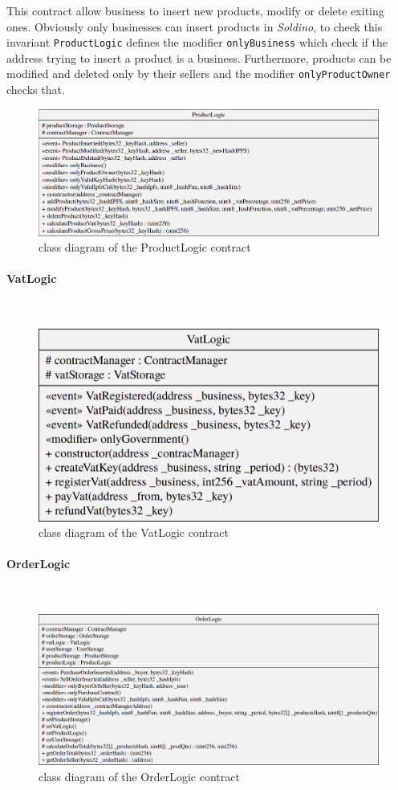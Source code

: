 \noindent This contract allow business to insert new products, modify or delete exiting ones. Obviously only businesses can insert products in \textit{Soldino}, to check this invariant \texttt{ProductLogic} defines the modifier \texttt{onlyBusiness} which check if the address trying to insert a product is a business. Furthermore, products can be modified and deleted only by their sellers and the modifier \texttt{onlyProductOwner} checks that.
\begin{figure}[H]
	\centering
	\includegraphics[scale=0.25]{res/images/solidity/productlogic.png}
	\caption{class diagram of the ProductLogic contract}
\end{figure}

\paragraph{VatLogic}\mbox{}\\

\no
\begin{figure}[H]
	\centering
	\includegraphics[scale=0.20]{res/images/solidity/vatlogic.png}
	\caption{class diagram of the VatLogic contract}
\end{figure}

\paragraph{OrderLogic}\mbox{}\\
\begin{figure}[H]
	\centering
	\includegraphics[scale=0.25]{res/images/solidity/orderlogic.png}
	\caption{class diagram of the OrderLogic contract}
\end{figure}